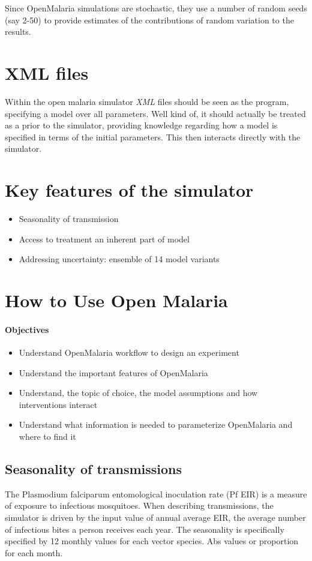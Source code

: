\documentclass[]{scrartcl}
\begin{document}
Since OpenMalaria simulations are stochastic, they use a number of random seeds (say 2-50) 
to provide estimates of the contributions of random variation to the results.

\section{XML files}

Within the open malaria simulator \textit{XML} files should be seen as the program, specifying a model over all parameters. Well kind of, it should actually be treated as a prior to the simulator, providing knowledge regarding how a model is specified in terms of the initial parameters. This then interacts directly with the simulator. 


\section{Key features of the simulator}

\begin{itemize}
\item Seasonality of transmission
\item Access to treatment an inherent part of model
\item Addressing uncertainty: ensemble of 14 model variants

\end{itemize}
\section{How to Use Open Malaria}

\paragraph*{Objectives}
\begin{itemize}
	\item Understand OpenMalaria workflow to design an experiment
	\item Understand the important features of OpenMalaria
	\item Understand, the topic of choice, the model assumptions and how interventions interact 
	\item Understand what information is needed to parameterize OpenMalaria and where to find it
\end{itemize}


\subsection{Seasonality of transmissions}
The Plasmodium falciparum entomological inoculation rate (Pf EIR) is a measure of exposure to infectious mosquitoes. 
When describing transmissions, the simulator is driven by the input value of annual average EIR, the average number of infectious bites a person receives each year.
The seasonality is specifically specified by 12 monthly values for each vector species. Abs values or proportion for each month.
\end{document}
